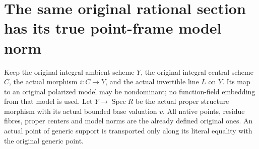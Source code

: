 \section{The same original rational section has its true point-frame model norm}

Keep the original integral ambient scheme $Y$, the original integral
central scheme $C$, the actual morphism $i:C\to Y$, and the actual
invertible line $L$ on $Y$. Its map to an original polarized model may
be nondominant; no function-field embedding from that model is used.
Let $Y\to\operatorname{Spec}R$ be the actual proper structure morphism
with its actual bounded base valuation $v$. All native points, residue
fibres, proper centers and model norms are the already defined original
ones. An actual point of generic support is transported only along its
literal equality with the original generic point.

